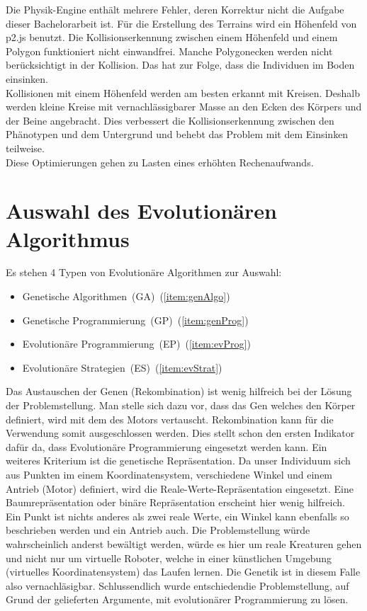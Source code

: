       Die Physik-Engine enthält mehrere Fehler, deren Korrektur nicht die Aufgabe dieser Bachelorarbeit ist.
      Für die Erstellung des Terrains wird ein Höhenfeld von p2.js benutzt.
      Die Kollisionserkennung zwischen einem Höhenfeld und einem Polygon funktioniert nicht einwandfrei.
      Manche Polygonecken werden nicht berücksichtigt in der Kollision.
      Das hat zur Folge, dass die Individuen im Boden einsinken.
      \\
      Kollisionen mit einem Höhenfeld werden am besten erkannt mit Kreisen.
      Deshalb werden kleine Kreise mit vernachlässigbarer Masse an den Ecken des Körpers und der Beine angebracht.
      Dies verbessert die Kollisionserkennung zwischen den Phänotypen und dem Untergrund
      und behebt das Problem mit dem Einsinken teilweise.
      \\
      Diese Optimierungen gehen zu Lasten eines erhöhten Rechenaufwands.

  \section{Auswahl des Evolutionären Algorithmus}

    Es stehen 4 Typen von Evolutionäre Algorithmen zur Auswahl:
    \begin{itemize}
      \item Genetische Algorithmen~(GA)~(\vref{item:genAlgo})
      \item Genetische Programmierung~(GP)~(\vref{item:genProg})
      \item Evolutionäre Programmierung~(EP)~(\vref{item:evProg})
      \item Evolutionäre Strategien~(ES)~(\vref{item:evStrat})
    \end{itemize}
    Das Austauschen der Genen (Rekombination) ist wenig hilfreich bei der Lösung der Problemstellung.
    Man stelle sich dazu vor, dass das Gen welches den Körper definiert, wird mit dem des Motors vertauscht.
    Rekombination kann für die Verwendung somit ausgeschlossen werden.
    Dies stellt schon den ersten Indikator dafür da,
    dass Evolutionäre Programmierung eingesetzt werden kann.
    Ein weiteres Kriterium ist die genetische Repräsentation.
    Da unser Individuum sich aus Punkten im einem Koordinatensystem,
    verschiedene Winkel und einem Antrieb (Motor) definiert, wird die Reale-Werte-Repräsentation eingesetzt.
    Eine Baumrepräsentation oder binäre Repräsentation erscheint hier wenig hilfreich.
    Ein Punkt ist nichts anderes als zwei reale Werte,
    ein Winkel kann ebenfalls so beschrieben werden und ein Antrieb auch.
    Die Problemstellung würde wahrscheinlich anderst bewältigt werden,
    würde es hier um reale Kreaturen gehen und nicht nur um virtuelle Roboter,
    welche in einer künstlichen Umgebung (virtuelles Koordinatensystem) das Laufen lernen.
    Die Genetik ist in diesem Falle also vernachläsigbar.
    Schlussendlich wurde entschiedendie Problemstellung, auf Grund der gelieferten Argumente, mit evolutionärer Programmierung zu lösen.

